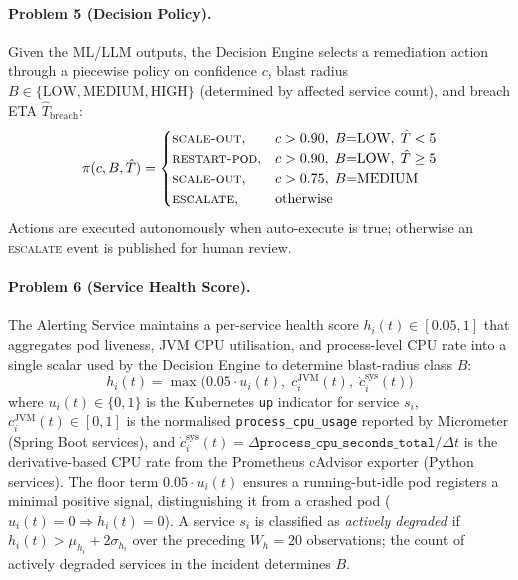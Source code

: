 \documentclass[a4paper,anonymous,UKenglish]{lipics-v2021}
\begin{document}
\paragraph*{Problem 5 (Decision Policy).}
Given the ML/LLM outputs, the Decision Engine selects a remediation action
through a piecewise policy on confidence $c$, blast radius
$B \in \{\text{LOW}, \text{MEDIUM}, \text{HIGH}\}$ (determined by affected
service count), and breach ETA $\hat{T}_{\text{breach}}$:
\begin{equation}
    \pi(c, B, \hat{T}) =
    \begin{cases}
      \textsc{scale-out},   & c > 0.90,\; B{=}\text{LOW},\; \hat{T} < 5 \\
      \textsc{restart-pod}, & c > 0.90,\; B{=}\text{LOW},\; \hat{T} \geq 5 \\
      \textsc{scale-out},   & c > 0.75,\; B{=}\text{MEDIUM} \\
      \textsc{escalate},    & \text{otherwise}
    \end{cases}
    \label{eq:policy}
\end{equation}
Actions are executed autonomously when auto-execute is true; otherwise an
\textsc{escalate} event is published for human review.

\paragraph*{Problem 6 (Service Health Score).}
The Alerting Service maintains a per-service health score
$h_i(t) \in [0.05, 1]$ that aggregates pod liveness, JVM CPU utilisation, and
process-level CPU rate into a single scalar used by the Decision Engine to
determine blast-radius class $B$:
\begin{equation}
    h_i(t) = \max\!\bigl(0.05 \cdot u_i(t),\; c_i^{\text{JVM}}(t),\;
    \dot{c}_i^{\text{sys}}(t)\bigr)
    \label{eq:health}
\end{equation}
where $u_i(t) \in \{0,1\}$ is the Kubernetes \texttt{up} indicator for service
$s_i$, $c_i^{\text{JVM}}(t) \in [0,1]$ is the normalised
\texttt{process\_cpu\_usage} reported by Micrometer (Spring Boot services), and
$\dot{c}_i^{\text{sys}}(t) = \Delta\texttt{process\_cpu\_seconds\_total}/\Delta t$
is the derivative-based CPU rate from the Prometheus cAdvisor exporter (Python
services). The floor term $0.05 \cdot u_i(t)$ ensures a running-but-idle pod
registers a minimal positive signal, distinguishing it from a crashed pod
($u_i(t){=}0 \Rightarrow h_i(t){=}0$). A service $s_i$ is classified as
\textit{actively degraded} if $h_i(t) > \mu_{h_i} + 2\sigma_{h_i}$ over the
preceding $W_h{=}20$ observations; the count of actively degraded services in
the incident determines $B$.
\end{document}
